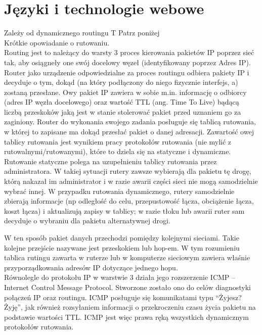 \chapter{Języki i technologie webowe}
\PartialToc


\vspace{0.4cm}
\noindent
{Zależy od dynamicznego routingu}
{T}
{Patrz poniżej}
{\\}
\noindent
Krótkie opowiadanie o rutowaniu.\\

Routing jest to należący do warsty 3 proces kierowania pakietów IP poprzez sieć tak, aby osiągneły one swój 
docelowy węzeł (identyfikowany poprzez Adres IP).\\
Router jako urządzenie odpowiedzialne za proces routingu odbiera pakiety IP i decyduje o tym, dokąd (na który podłączony do niego fizycznie interfejs, a) zostaną przesłane. Owy pakiet IP zawiera w sobie m.in. informację o odbiorcy (adres IP węzła docelowego) oraz wartość TTL (ang. Time To Live) bądącą liczbą przeskoków jaką jest w stanie stolerować pakiet przed uznaniem go za zaginiony. Router do wykonania swojego zadania posługuje się tablicą rutowania, w której to zapisane ma dokąd przesłać pakiet o danej adresacji. Zawartość owej tablicy rutowania jest wynikiem pracy protokołów rutowania (nie mylić z rutowalnymi/rutowanymi), które to dziela się na statyczne i dynamiczne.\\
Rutowanie statyczne polega na uzupełnieniu tablicy rutowania przez administratora. W takiej sytuacji rutery zawsze wybierają dla pakietu tę drogę, którą nakazał im administrator i w razie awarii części sieci nie mogą samodzielnie wybrać innej. W przypadku rutowania dynamicznego,  rutery samodzielnie zbierają informacje (np odległość do celu, przepustowość łącza, obciążenie łącza, koszt łącza) i aktualizują zapisy w tablicy; w razie tłoku lub awarii ruter sam decyduje o wybraniu dla pakietu alternatywnej drogi. 

W ten sposób pakiet danych przechodzi pomiędzy kolejnymi sieciami. Takie kolejne przejście
nazywane jest przeskokiem lub hop-em. W tym rozumieniu tablica rutingu zawarta w ruterze lub w
komputerze sieciowym zawiera właśnie przyporządkowania adresów IP dotyczące jednego hopu.\\
Równolegle do protokołu IP w warstwie 3 działa jego rozszerzenie ICMP – Internet Control Message Protocol. Stworzone zostało ono do celów diagnostyki połączeń IP oraz routingu. ICMP posługuje się komunikatami typu “Żyjesz? Żyję”, jak również rozsyłaniem informacji o przekroczeniu czasu życia pakietu na podstawie wartości TTL. ICMP jest więc prawa ręką wszystkich dynamicznym protokołów rutowania.\\ \\


